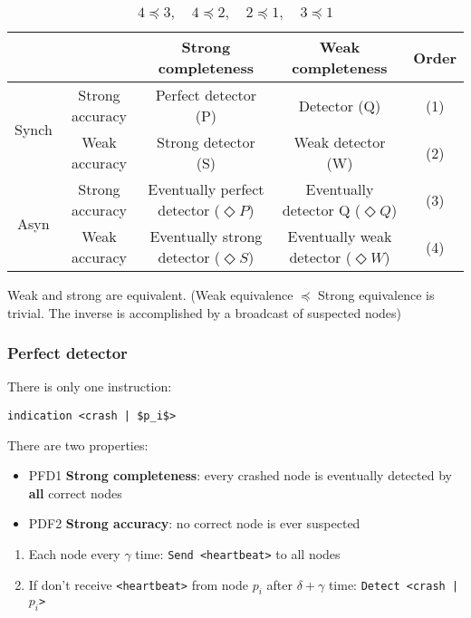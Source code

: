\begin{table}
    \begin{tabular}{cc|c|c|c}
        \toprule
        & & Strong completeness & Weak completeness & Order\\
        \toprule

        \multirow{2}{*}{Synch} & Strong accuracy & Perfect detector (P) &
        Detector (Q) & (1) \\
        & Weak accuracy & Strong detector (S) & Weak detector (W) & (2) \\

        \midrule

        \multirow{2}{*}{Asyn} & Strong accuracy & Eventually perfect detector
        ($\Diamond P$) & Eventually detector Q ($\Diamond Q$) & (3) \\
        & Weak accuracy & Eventually strong detector ($\Diamond S$) & Eventually weak detector
        ($\Diamond W$) & (4) \\
        \bottomrule
    \end{tabular}
    \caption{$4 \preceq 3, \quad 4 \preceq 2, \quad 2 \preceq 1, \quad 3
    \preceq 1$}
\end{table}

Weak and strong are equivalent. (Weak equivalence $\preceq$ Strong
equivalence is trivial. The inverse is accomplished by a broadcast of
suspected nodes)

\subsubsection{Perfect detector}

There is only one instruction:
\begin{lstlisting}[caption={Perfect failure detector}, mathescape, captionpos=b]
indication <crash | $p_i$>
\end{lstlisting}

There are two properties:

\begin{itemize}
    \item PFD1 \textbf{Strong completeness}: every crashed node is eventually
    detected by \textbf{all} correct nodes
    \item PDF2 \textbf{Strong accuracy}: no correct node is ever suspected
\end{itemize}

\begin{enumerate}
    \item Each node every $\gamma$ time: \texttt{Send <heartbeat>} to all nodes
    \item If don't receive \texttt{<heartbeat>} from node $p_i$ after $\delta + \gamma$ time:
    \texttt{Detect <crash | $p_i$>}
\end{enumerate}

